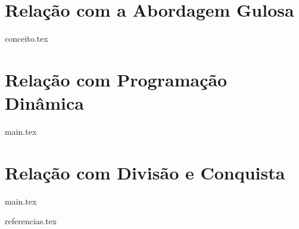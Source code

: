 \documentclass{article}
\begin{document}
\section{Relação com a Abordagem Gulosa}
{conceito.tex}

\section{Relação com Programação Dinâmica}
{main.tex}

\section{Relação com Divisão e Conquista}
{main.tex}

{referencias.tex}
\end{document}
